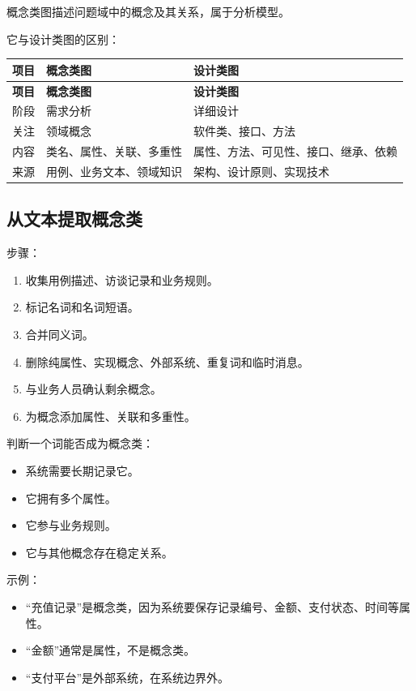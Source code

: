 \documentclass[UTF8,zihao=-4]{ctexart}
\begin{document}
概念类图描述问题域中的概念及其关系，属于分析模型。

它与设计类图的区别：

{
\footnotesize
\begin{longtable}{|>{\raggedright\arraybackslash}p{}|>{\raggedright\arraybackslash}p{}|>{\raggedright\arraybackslash}p{}|}
\hline
\textbf{项目} & \textbf{概念类图} & \textbf{设计类图} \\
\hline
\endfirsthead
\hline
\textbf{项目} & \textbf{概念类图} & \textbf{设计类图} \\
\hline
\endhead
阶段 & 需求分析 & 详细设计 \\
\hline
关注 & 领域概念 & 软件类、接口、方法 \\
\hline
内容 & 类名、属性、关联、多重性 & 属性、方法、可见性、接口、继承、依赖 \\
\hline
来源 & 用例、业务文本、领域知识 & 架构、设计原则、实现技术 \\
\hline
\end{longtable}
}


\subsection{从文本提取概念类}

步骤：

\begin{enumerate}
\item 收集用例描述、访谈记录和业务规则。
\item 标记名词和名词短语。
\item 合并同义词。
\item 删除纯属性、实现概念、外部系统、重复词和临时消息。
\item 与业务人员确认剩余概念。
\item 为概念添加属性、关联和多重性。
\end{enumerate}

判断一个词能否成为概念类：

\begin{itemize}
\item 系统需要长期记录它。
\item 它拥有多个属性。
\item 它参与业务规则。
\item 它与其他概念存在稳定关系。
\end{itemize}

示例：

\begin{itemize}
\item “充值记录”是概念类，因为系统要保存记录编号、金额、支付状态、时间等属性。
\item “金额”通常是属性，不是概念类。
\item “支付平台”是外部系统，在系统边界外。
\end{itemize}
\end{document}
